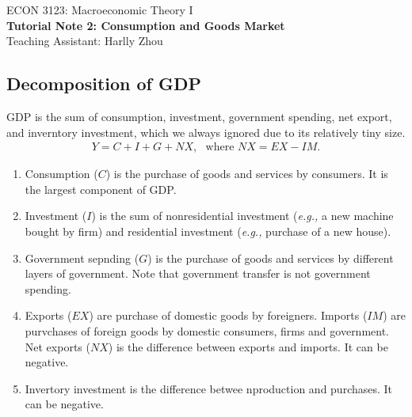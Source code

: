 \documentclass[12pt]{article}
\numberwithin{equation}{section}
\begin{document}
\begin{center}
    ECON 3123: Macroeconomic Theory I\\
    {\large \textbf{Tutorial Note 2: Consumption and Goods Market}}\\
    Teaching Assistant: Harlly Zhou
\end{center}

\subsection*{Decomposition of GDP}
GDP is the sum of consumption, investment, government spending, net export, and inverntory investment, which we always ignored due to its relatively tiny size.
\begin{align*}
    Y = C + I + G + NX,\,\,\,\, \text{where } NX = EX - IM.
\end{align*}
\begin{enumerate}[label=(\arabic*)]
    \item Consumption ($C$) is the purchase of goods and services by consumers. It is the largest component of GDP.
    \item Investment ($I$) is the sum of nonresidential investment (\textit{e.g.,} a new machine bought by firm) and residential investment (\textit{e.g., }purchase of a new house). 
    \item Government sepnding ($G$) is the purchase of goods and services by different layers of government. Note that government transfer is not government spending.
    \item Exports ($EX$) are purchase of domestic goods by foreigners. Imports ($IM$) are purvchases of foreign goods by domestic consumers, firms and government. Net exports ($NX$) is the difference between exports and imports. It can be negative. 
    \item Invertory investment is the difference betwee nproduction and purchases. It can be negative.
\end{enumerate}
\end{document}
